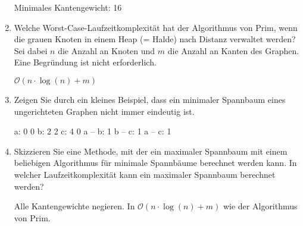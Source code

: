 \documentclass{bschlangaul-aufgabe}
\begin{document}
\begin{enumerate}
\begin{liAntwort}
\begin{center}
\end{center}
Minimales Kantengewicht: 16
\end{liAntwort}


\item Welche Worst-Case-Laufzeitkomplexität hat der Algorithmus von
Prim, wenn die grauen Knoten in einem Heap (= Halde) nach Distanz
verwaltet werden? Sei dabei $n$ die Anzahl an Knoten und $m$ die Anzahl
an Kanten des Graphen. Eine Begründung ist nicht erforderlich.

\begin{liAntwort}
$\mathcal{O}(n \cdot \log(n) + m)$
\end{liAntwort}


\item Zeigen Sie durch ein kleines Beispiel, dass ein minimaler
Spannbaum eines ungerichteten Graphen nicht immer eindeutig ist.

\begin{liGraphenFormat}
a: 0 0
b: 2 2
c: 4 0
a -- b: 1
b -- c: 1
a -- c: 1
\end{liGraphenFormat}

\begin{liAntwort}
\hspace{0.5cm}
\hspace{0.5cm}
\end{liAntwort}


\item Skizzieren Sie eine Methode, mit der ein maximaler Spannbaum mit
einem beliebigen Algorithmus für minimale Spannbäume berechnet werden
kann. In welcher Laufzeitkomplexität kann ein maximaler Spannbaum
berechnet werden?

\begin{liAntwort}
Alle Kantengewichte negieren. In $\mathcal{O}(n \cdot \log(n) + m)$ wie
der Algorithmus von Prim.
\end{liAntwort}
\end{enumerate}
\end{document}
